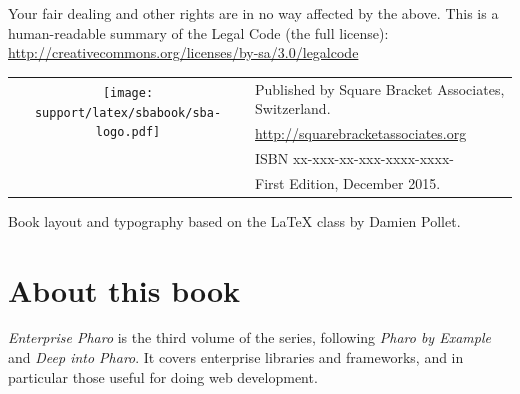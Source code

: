 \documentclass[10pt,twoside,english,showtrims]{support/latex/sbabook/sbabook}
\begin{document}
{  Your fair dealing and other rights are in no way affected by the
  above. This is a human-readable summary of the Legal Code (the full
  license): \\
  \url{http://creativecommons.org/licenses/by-sa/3.0/legalcode}

  \vfill

  \begin{tabular}{@{}c@{\quad}l}
    \multirow{2}{*}{\texttt{[image: support/latex/sbabook/sba-logo.pdf]}}
    & Published by Square Bracket Associates, Switzerland. \\
    & \url{http://squarebracketassociates.org} \\[\smallskipamount]
    & ISBN xx-xxx-xx-xxx-xxxx-xxxx- \\
    & First Edition, December 2015. \\
  \end{tabular}
  \medskip

  Book layout and typography based on the  \LaTeX{} class by Damien Pollet.
}


\frontmatter
\pagestyle{plain}


\chapter*{About this book}

\emph{Enterprise Pharo} is the third volume of the series, following
\emph{Pharo by Example} and \emph{Deep into Pharo}. It covers
enterprise libraries and frameworks, and in particular those useful for
doing web development.
\end{document}
